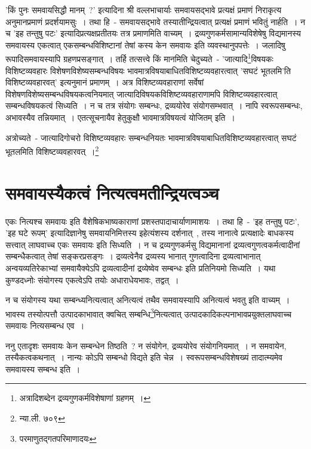 	'किं पुनः समवायसिद्धौ मानम्~?' इत्यादिना श्री वल्लभाचार्याः समवायसद्भावे प्रत्यक्षं प्रमाणं निराकृत्य  अनुमानप्रमाणं प्रदर्शयामसुः~। तथा हि~- समवायसद्भावे तस्यातीन्द्रियत्वात् प्रत्यक्षं प्रमाणं भवितुं नार्हति~। न च 'इह तन्तुषु पटः' इत्यादिप्रत्यक्षप्रतीतयः तत्र प्रमाणमिति वाच्यम्~। द्रव्यगुणकर्मसामान्यविशेषेषु विद्यमानस्य समवायस्य एकत्वात् एकसम्बन्धविशिष्टानां तेषां कस्य केन समवायः इति व्यवस्थानुपपत्तेः~। जलादिषु रूपादिसमवायस्यापि ग्रहणप्रसङ्गात्~। तर्हि तत्सत्त्वे किं मानमिति चेदुच्यते~- 'जात्यादि\footnote{अत्रादिशब्देन द्रव्यगुणकर्मविशेषाणां ग्रहणम्~।}विषयकः  विशिष्टव्यवहारः विशेषणविशेष्यसम्बन्धविषयः भावमात्रविषयाबाधितविशिष्टव्यवहारत्वात् 'सघटं भूतलमि'ति विशिष्टव्यवहारवत्' इत्यनुमानं प्रमाणम्~। अत्र विशिष्टव्यवहाराणां सर्वेषां विशेषणविशेष्यसम्बन्धविषयकत्वनियमात् जात्यादिविषयकविशिष्टव्यवहाराणामपि विशिष्टव्यवहारत्वात् सम्बन्धविषयकत्वं सिध्यति~। न च तत्र संयोगः सम्बन्धः, द्रव्ययोरेव संयोगसम्भवात्~। नापि स्वरूपसम्बन्धः, अभावस्यैव तन्नियमात्~। एतत्सूचनायैव हेतुकुक्षौ भावमात्रविषयत्वं योजितम् इति~।

	{\fontsize{11.7}{0}\selectfont\s अत्रोच्यते~- जात्यादिगोचरो विशिष्टव्यवहारः सम्बन्धनियतः भावमात्रविषयाबाधितविशिष्टव्यवहारत्वात् सघटं भूतलमिति विशिष्टव्यवहारवत्~।\footnote{न्या.ली. ७०९}}



	\section{समवायस्यैकत्वं नित्यत्वमतीन्द्रियत्वञ्च} 

	एकः नित्यश्च समवायः इति वैशेषिकभाष्यकाराणां प्रशस्तपादाचार्याणामाशयः~। तथा हि~- 'इह तन्तुषु पटः', 'इह घटे रूपम्' इत्यादिज्ञानेषु समवायनिमित्तस्य इहेत्यंशस्य दर्शनात्~, तस्य नानात्वे प्रत्यक्षादेः बाधकस्य सत्त्वात् लाघवाच्च एकः समवायः इति सिध्यति~। न च द्रव्यगुणकर्मसु विद्यमानानां द्रव्यत्वगुणत्वकर्मत्वादीनां सम्बन्धैकत्वात् तेषां सङ्करप्रसङ्गः~। द्रव्यत्वेनैव द्रव्यस्य भानात् गुणत्वादिना द्रव्यत्वाभानात् अन्वयव्यतिरेकाभ्यां समवायैक्येऽपि द्रव्यत्वादीनां द्रव्येष्वेव सम्बन्धः इति प्रतिनियमो सिध्यति~। यथा कुण्डदध्नोः संयोगस्य एकत्वेऽपि तयोः अधाराधेयभावः, तद्वत्~। 

	न च संयोगस्य यथा सम्बन्ध्यनित्यत्वात् अनित्यत्वं तथैव समवायस्यापि अनित्यत्वं भवतु इति वाच्यम्~। भावस्य तस्योत्पत्तौ उत्पादकाभावात् क्वचित् सम्बन्धि\footnote{परमाणुतद्गतपरिमाणादयः}नित्यत्वात् उत्पादकादिकल्पनाभावप्रयुक्तलाघवाच्च समवायः नित्यसम्बन्ध एव~। 

	ननु एतादृशः समवायः केन सम्बन्धेन तिष्ठति~? न संयोगेन, द्रव्ययोरेव संयोगनियमात्~। न समवायेन, तस्यैकत्वकथनात्~। नान्यः कोऽपि सम्बन्धो विद्यते इति चेन्न~। स्वरूपसम्बन्धविशेषख्यं तादात्म्यमेव समवायस्य सम्बन्ध इति~। 

